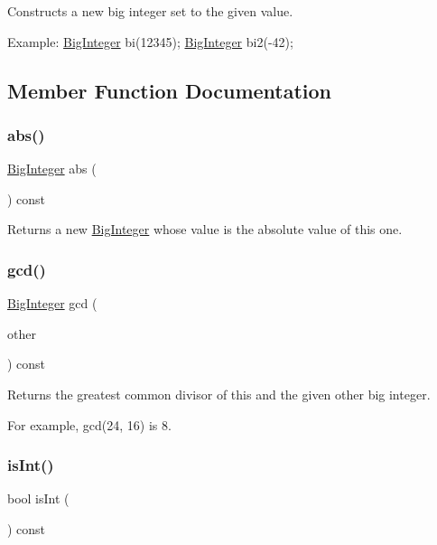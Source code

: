 Constructs a new big integer set to the given value. 

Example\+: \mbox{\hyperlink{classBigInteger}{Big\+Integer}} bi(12345); \mbox{\hyperlink{classBigInteger}{Big\+Integer}} bi2(-\/42); 

\subsection{Member Function Documentation}
\mbox{\label{classBigInteger_aa60f0a3be5766293b78752ac6d7430fe}} 
\subsubsection{\texorpdfstring{abs()}{abs()}}
{\footnotesize\ttfamily \mbox{\hyperlink{classBigInteger}{Big\+Integer}} abs (\begin{DoxyParamCaption}{ }\end{DoxyParamCaption}) const}



Returns a new \mbox{\hyperlink{classBigInteger}{Big\+Integer}} whose value is the absolute value of this one. 

\mbox{\label{classBigInteger_a7863ef61a27a110c2971b0011ebd74b9}} 
\subsubsection{\texorpdfstring{gcd()}{gcd()}}
{\footnotesize\ttfamily \mbox{\hyperlink{classBigInteger}{Big\+Integer}} gcd (\begin{DoxyParamCaption}\item[{const \mbox{\hyperlink{classBigInteger}{Big\+Integer}} \&}]{other }\end{DoxyParamCaption}) const}



Returns the greatest common divisor of this and the given other big integer. 

For example, gcd(24, 16) is 8. \mbox{\label{classBigInteger_a772efbf9d46b2e1e3840763a76307040}} 
\subsubsection{\texorpdfstring{is\+Int()}{isInt()}}
{\footnotesize\ttfamily bool is\+Int (\begin{DoxyParamCaption}{ }\end{DoxyParamCaption}) const}



